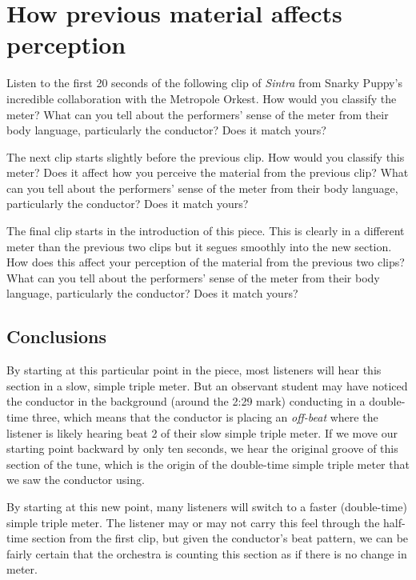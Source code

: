 \documentclass{book}
\begin{document}
\hypertarget{how-previous-material-affects-perception}{%
\section{How previous material affects
perception}\label{how-previous-material-affects-perception}}

Listen to the first 20 seconds of the following clip of \emph{Sintra} from
Snarky Puppy's incredible collaboration with the Metropole Orkest. How would
you classify the meter? What can you tell about the performers' sense of the
meter from their body language, particularly the conductor? Does it match
yours?

The next clip starts slightly before the previous clip. How would you classify
this meter? Does it affect how you perceive the material from the previous
clip? What can you tell about the performers' sense of the meter from their
body language, particularly the conductor? Does it match yours?

The final clip starts in the introduction of this piece. This is clearly in a
different meter than the previous two clips but it segues smoothly into the
new section. How does this affect your perception of the material from the
previous two clips? What can you tell about the performers' sense of the meter
from their body language, particularly the conductor? Does it match yours?

\hypertarget{conclusions-62}{%
\subsection{Conclusions}\label{conclusions-62}}

By starting at this particular point in the piece, most listeners will hear
this section in a slow, simple triple meter. But an observant student may have
noticed the conductor in the background (around the 2:29 mark) conducting in a
double-time three, which means that the conductor is placing an
\emph{off-beat} where the listener is likely hearing beat 2 of their slow
simple triple meter. If we move our starting point backward by only ten
seconds, we hear the original groove of this section of the tune, which is the
origin of the double-time simple triple meter that we saw the conductor using.

By starting at this new point, many listeners will switch to a faster
(double-time) simple triple meter. The listener may or may not carry this feel
through the half-time section from the first clip, but given the conductor's
beat pattern, we can be fairly certain that the orchestra is counting this
section as if there is no change in meter.
\end{document}
